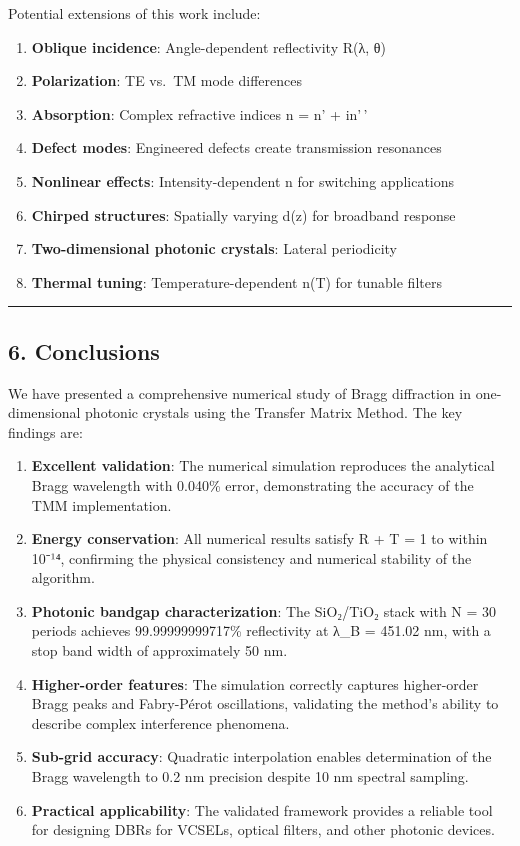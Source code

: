 \documentclass[
]{article}
\providecommand{\tightlist}{%
  \setlength{\itemsep}{0pt}\setlength{\parskip}{0pt}}
\begin{document}
Potential extensions of this work include:

\begin{enumerate}
\def\labelenumi{\arabic{enumi}.}
\tightlist
\item
  \textbf{Oblique incidence}: Angle-dependent reflectivity R(λ, θ)
\item
  \textbf{Polarization}: TE vs.~TM mode differences
\item
  \textbf{Absorption}: Complex refractive indices n = n' + in'\,'
\item
  \textbf{Defect modes}: Engineered defects create transmission
  resonances
\item
  \textbf{Nonlinear effects}: Intensity-dependent n for switching
  applications
\item
  \textbf{Chirped structures}: Spatially varying d(z) for broadband
  response
\item
  \textbf{Two-dimensional photonic crystals}: Lateral periodicity
\item
  \textbf{Thermal tuning}: Temperature-dependent n(T) for tunable
  filters
\end{enumerate}

\begin{center}\rule{0.5\linewidth}{0.5pt}\end{center}

\subsection{6. Conclusions}\label{conclusions}

We have presented a comprehensive numerical study of Bragg diffraction
in one-dimensional photonic crystals using the Transfer Matrix Method.
The key findings are:

\begin{enumerate}
\def\labelenumi{\arabic{enumi}.}
\item
  \textbf{Excellent validation}: The numerical simulation reproduces the
  analytical Bragg wavelength with 0.040\% error, demonstrating the
  accuracy of the TMM implementation.
\item
  \textbf{Energy conservation}: All numerical results satisfy R + T = 1
  to within 10⁻¹⁴, confirming the physical consistency and numerical
  stability of the algorithm.
\item
  \textbf{Photonic bandgap characterization}: The SiO₂/TiO₂ stack with N
  = 30 periods achieves 99.99999999717\% reflectivity at λ\_B = 451.02
  nm, with a stop band width of approximately 50 nm.
\item
  \textbf{Higher-order features}: The simulation correctly captures
  higher-order Bragg peaks and Fabry-Pérot oscillations, validating the
  method's ability to describe complex interference phenomena.
\item
  \textbf{Sub-grid accuracy}: Quadratic interpolation enables
  determination of the Bragg wavelength to 0.2 nm precision despite 10
  nm spectral sampling.
\item
  \textbf{Practical applicability}: The validated framework provides a
  reliable tool for designing DBRs for VCSELs, optical filters, and
  other photonic devices.
\end{enumerate}
\end{document}
